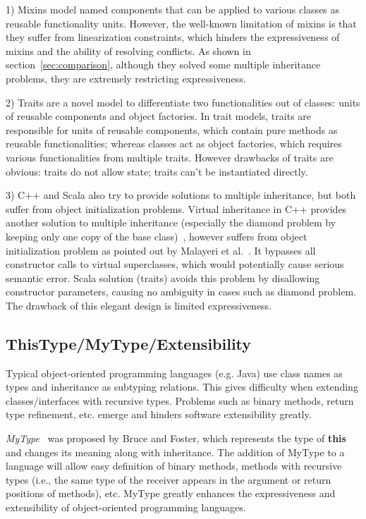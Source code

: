 1) Mixins model named components that can be applied to various classes as
reusable functionality units. However, the well-known limitation of mixins is
that they suffer from linearization constraints, which hinders the
expressiveness of mixins and the ability of resolving conflicts.  As shown in
section~\ref{sec:comparison}, although they solved some multiple inheritance
problems, they are extremely restricting expressiveness. 

2) Traits are a novel model to differentiate two functionalities out of classes:
units of reusable components and object factories. In trait models, traits are
responsible for units of reusable components, which contain pure methods as
reusable functionalities; whereas classes act as object factories, which
requires various functionalities from multiple traits. However drawbacks of
traits are obvious: traits do not allow state; traits can't be instantiated
directly.

3) C++ and Scala also try to provide solutions to multiple inheritance, but both
suffer from object initialization problems. Virtual inheritance in C++ provides
another solution to multiple inheritance (especially the diamond problem by
keeping only one copy of the base class)~\cite{ellis1990annotated}, however
suffers from object initialization problem as pointed out by Malayeri et
al.~\cite{malayeri2009cz}. It bypasses all constructor calls to virtual
superclasses, which would potentially cause serious semantic error. Scala
solution (traits) avoids this problem by disallowing constructor parameters,
causing no ambiguity in cases such as diamond problem. The drawback of this
elegant design is limited expressiveness. 

\subsection{ThisType/MyType/Extensibility}
Typical object-oriented programming languages (e.g. Java) use class names as
types and inheritance as subtyping relations. This gives difficulty when
extending classes/interfaces with recursive types. Problems such as binary
methods, return type refinement, etc. emerge and hinders software extensibility
greatly.

\emph{MyType}~\cite{bruce1994paradigmatic} was proposed by Bruce and Foster,
which represents the type of \textbf{this} and changes its meaning along with
inheritance. The addition of MyType to a language will allow easy definition of
binary methods, methods with recursive types (i.e., the same type of the
receiver appears in the argument or return positions of methods), etc. MyType
greatly enhances the expressiveness and extensibility of object-oriented
programming languages. 

